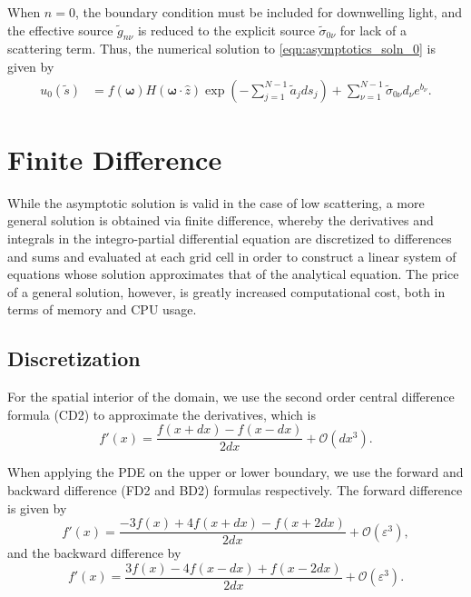 \documentclass[ms,cpyr,lof,lot]{uathesis}
\renewcommand\vec\bm
\begin{document}
When $n=0$, the boundary condition must be included for downwelling light,
and the effective source $\tilde{g}_{n\nu}$ is reduced to the explicit source $\tilde{\sigma}_{0\nu}$
for lack of a scattering term.
Thus, the numerical solution to \eqref{eqn:asymptotics_soln_0} is given by
\begin{align}
  u_0(\tilde{s}) &= f(\vec{\omega})H(\vec{\omega}\cdot\hat{z}) \exp\left( -\sum_{j=1}^{N-1}\tilde{a}_jds_j\right)
  + \sum_{\nu=1}^{N-1} \tilde{\sigma}_{0\nu}d_\nu e^{b_\nu}.
\end{align}

\section{Finite Difference}
While the asymptotic solution is valid in the case of low scattering, a more general solution is obtained via finite difference, whereby the derivatives and integrals in the integro-partial differential equation are discretized to differences and sums and evaluated at each grid cell in order to construct a linear system of equations whose solution approximates that of the analytical equation.
The price of a general solution, however, is greatly increased computational cost, both in terms of memory and CPU usage.

\subsection{Discretization}
\label{sec:discretization}

For the spatial interior of the domain, we use the second order central difference formula (CD2) to approximate the derivatives, which is
\begin{equation*}
    f'(x) = \frac{f(x+dx)-f(x-dx)}{2dx} + \mathcal{O}(dx^3).
\end{equation*}

When applying the PDE on the upper or lower boundary, we use the forward and backward difference (FD2 and BD2) formulas respectively.
The forward difference is given by
\begin{equation*}
    \label{eqn:FD2}
    f'(x) = \frac{-3f(x)+4f(x+dx)-f(x+2dx)}{2dx} + \mathcal{O}(\varepsilon^3),
\end{equation*}
and the backward difference by
\begin{equation*}
    \label{eqn:BD2}
    f'(x) = \frac{3f(x)-4f(x-dx)+f(x-2dx)}{2dx} + \mathcal{O}(\varepsilon^3).
\end{equation*}
\end{document}
